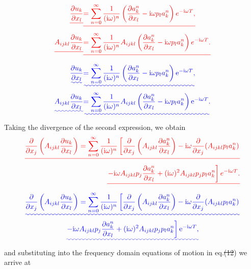 \documentclass [a4paper,12pt]{paper}
\providecommand{\DIFadd}[1]{{\protect\color{blue}\uwave{#1}}} %
\providecommand{\DIFdel}[1]{{\protect\color{red}\sout{#1}}}                      %
\providecommand{\DIFaddbegin}{} %
\providecommand{\DIFaddend}{} %
\providecommand{\DIFdelbegin}{} %
\providecommand{\DIFdelend}{} %
\begin{document}
\DIFdelbegin \begin{eqnarray*}
\DIFdel{\frac{\partial u_{k}}{\partial x_{l}}}&\DIFdel{=\sum_{n=0}^{\infty}\frac{1}{(\ii\omega)^{n}}\left(\frac{\partial a_{k}^{n}}{\partial x_{l}}
-\ii\omega p_{l}a_{k}^{n}\right)e^{-\ii\omega T}, }\\
\DIFdel{A_{ijkl}\frac{\partial u_{k}}{\partial x_{l}}}&\DIFdel{=\sum_{n=0}^{\infty}\frac{1}{(\ii\omega)^{n}}A_{ijkl}\left(\frac{\partial a_{k}^{n}}{\partial x_{l}}-\ii\omega p_{l}a_{k}^{n}\right)e^{-\ii\omega T}.
}\end{eqnarray*}%
\DIFdelend \DIFaddbegin \begin{align}
\DIFadd{\frac{\partial u_{k}}{\partial x_{l}}}&\DIFadd{=\sum_{n=0}^{\infty}\frac{1}{(\ii\omega)^{n}}\left(\frac{\partial a_{k}^{n}}{\partial x_{l}}
-\ii\omega p_{l}a_{k}^{n}\right)\ee^{-\ii\omega T}, \label{eq:14}}\\
\DIFadd{A_{ijkl}\frac{\partial u_{k}}{\partial x_{l}}}&\DIFadd{=\sum_{n=0}^{\infty}\frac{1}{(\ii\omega)^{n}}A_{ijkl}\left(\frac{\partial a_{k}^{n}}{\partial x_{l}}-\ii\omega p_{l}a_{k}^{n}\right)\ee^{-\ii\omega T}. \label{eq:15}
}\end{align}\DIFaddend 
Taking the divergence of the second expression, we obtain
\DIFdelbegin \begin{eqnarray*}
\DIFdel{\frac{\partial}{\partial x_{j}}\left(A_{ijkl}\frac{\partial u_{k}}{\partial x_{l}}\right)=\sum_{n=0}^{\infty}\frac{1}{(\ii\omega)^{n}}\left[\frac{\partial}{\partial x_{j}}\left(A_{ijkl}\frac{\partial a_{k}^{n}}{\partial x_{l}}\right)
-\ii\omega\frac{\partial}{\partial x_{j}}(A_{ijkl}p_{l}a_{k}^{n}) \right. }\\
\DIFdel{\left. -\ii\omega A_{ijkl}p_{j}\frac{\partial a_{k}^{n}}{\partial x_{l}}+(\ii\omega)^{2}A_{ijkl}p_{j}p_{l}a_{k}^{n}\right]e^{-\ii\omega T}.
}\end{eqnarray*}%
\DIFdelend \DIFaddbegin \begin{multline}
\DIFadd{\frac{\partial}{\partial x_{j}}\left(A_{ijkl}\frac{\partial u_{k}}{\partial x_{l}}\right)=\sum_{n=0}^{\infty}\frac{1}{(\ii\omega)^{n}}\left[\frac{\partial}{\partial x_{j}}\left(A_{ijkl}\frac{\partial a_{k}^{n}}{\partial x_{l}}\right)
-\ii\omega\frac{\partial}{\partial x_{j}}(A_{ijkl}p_{l}a_{k}^{n}) \right. }\\
\DIFadd{\left. -\ii\omega A_{ijkl}p_{j}\frac{\partial a_{k}^{n}}{\partial x_{l}}+(\ii\omega)^{2}A_{ijkl}p_{j}p_{l}a_{k}^{n}\right]\ee^{-\ii\omega T},
\label{eq:16}
}\end{multline}\DIFaddend 
and substituting into the frequency domain equations of motion in eq.\DIFdelbegin \DIFdel{(12}\DIFdelend \DIFaddbegin \DIFadd{~(\ref{eq:12}}\DIFaddend ) we arrive at
\end{document}
